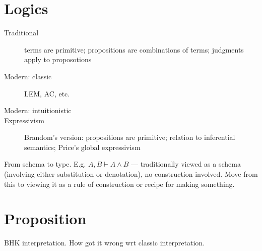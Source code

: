 \chapter{Logics}
\label{sect:logics}

\begin{description}
\item [Traditional] terms are primitive; propositions are combinations of terms; judgments apply to proposotions
\item [Modern: classic] LEM, AC, etc.
\item [Modern: intuitionistic]
\item [Expressivism]  Brandom's version: propositions are primitive; relation to inferential semantics; Price's global expressivism
\end{description}

\begin{ednote}
  From schema to type.  E.g. \(A,B\vdash A\land B\) --- traditionally
  viewed as a schema (involving either substitution or denotation), no
  construction involved.  Move from this to viewing it as a rule of
  construction or recipe for making something.
\end{ednote}

\chapter{Proposition}

\begin{ednote}
  BHK interpretation.  How \ML{} got it wrong wrt classic interpretation.
\end{ednote}


